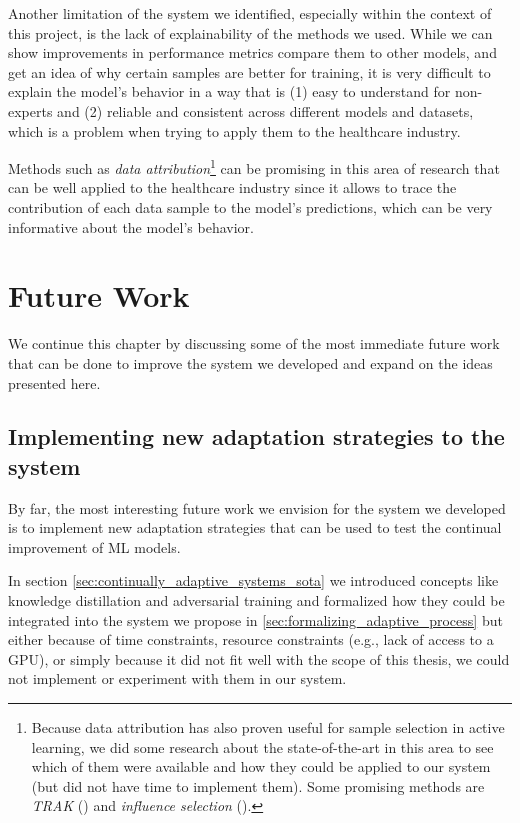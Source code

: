 \documentclass[../main.tex]{subfiles}
\begin{document}
    Another limitation of the system we identified, especially within the context of this project, is the lack of explainability of the methods we used. While we can show improvements in performance metrics compare them to other models, and get an idea of why certain samples are better for training, it is very difficult to explain the model's behavior in a way that is (1) easy to understand for non-experts and (2) reliable and consistent across different models and datasets, which is a problem when trying to apply them to the healthcare industry.
    
    Methods such as \textit{data attribution}\footnote{Because data attribution has also proven useful for sample selection in active learning, we did some research about the state-of-the-art in this area to see which of them were available and how they could be applied to our system (but did not have time to implement them). Some promising methods are \textit{TRAK} (\cite{park_trak_2023}) and \textit{influence selection} (\cite{liu_influence_2021}).} can be promising in this area of research that can be well applied to the healthcare industry since it allows to trace the contribution of each data sample to the model's predictions, which can be very informative about the model's behavior.
    
    \vspace{-0.3cm}
    \section{Future Work} \label{conclusions:future_work} 

    We continue this chapter by discussing some of the most immediate future work that can be done to improve the system we developed and expand on the ideas presented here. 

    \vspace{-0.1cm}
    \subsection{Implementing new adaptation strategies to the system 
    } \label{conclusions:future_work:adaptation_strategies}

    By far, the most interesting future work we envision for the system we developed is to implement new adaptation strategies that can be used to test the continual improvement of ML models. 
    
    In section \ref{sec:continually_adaptive_systems_sota} we introduced concepts like knowledge distillation and adversarial training and formalized how they could be integrated into the system we propose in \ref{sec:formalizing_adaptive_process} but either because of time constraints, resource constraints (e.g., lack of access to a GPU), or simply because it did not fit well with the scope of this thesis, we could not implement or experiment with them in our system.
\end{document}
